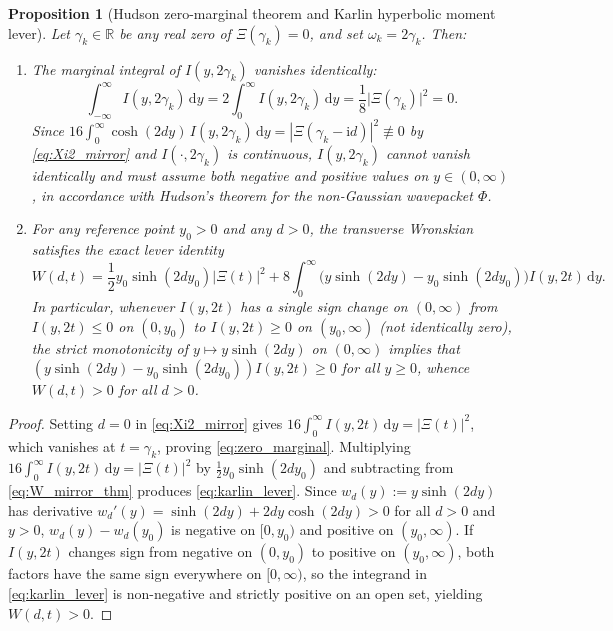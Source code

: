 \documentclass[11pt,a4paper,reqno]{amsart}
\newtheorem{proposition}[theorem]{Proposition}
\theoremstyle{definition}
\theoremstyle{remark}
\numberwithin{equation}{section}
\newcommand{\dd}{\mathrm{d}}
\newcommand{\ii}{\mathrm{i}}
\begin{document}
\begin{proposition}[Hudson zero-marginal theorem and Karlin hyperbolic moment lever]\label{prop:hudson_karlin}
Let $\gamma_k \in \mathbb{R}$ be any real zero of $\Xi(\gamma_k) = 0$, and set $\omega_k = 2\gamma_k$. Then:
\begin{enumerate}
\item[\textup{(a)}] The marginal integral of $I(y,2\gamma_k)$ vanishes identically:
\begin{equation}\label{eq:zero_marginal}
\int_{-\infty}^\infty I(y,2\gamma_k)\,\dd y = 2\int_0^\infty I(y,2\gamma_k)\,\dd y = \frac{1}{8}\big|\Xi(\gamma_k)\big|^2 = 0.
\end{equation}
Since $16\int_0^\infty \cosh(2d y)\,I(y,2\gamma_k)\,\dd y = |\Xi(\gamma_k-\ii d)|^2 \not\equiv 0$ by \eqref{eq:Xi2_mirror} and $I(\cdot,2\gamma_k)$ is continuous, $I(y,2\gamma_k)$ cannot vanish identically and must assume both negative and positive values on $y \in (0,\infty)$, in accordance with Hudson's theorem \cite{Hudson1974} for the non-Gaussian wavepacket $\Phi$.
\item[\textup{(b)}] For any reference point $y_0 > 0$ and any $d > 0$, the transverse Wronskian satisfies the exact lever identity
\begin{equation}\label{eq:karlin_lever}
W(d,t) = \frac{1}{2}y_0\sinh(2d y_0)\big|\Xi(t)\big|^2 + 8\int_0^\infty \Big(y\sinh(2d y) - y_0\sinh(2d y_0)\Big)I(y,2t)\,\dd y.
\end{equation}
In particular, whenever $I(y,2t)$ has a single sign change on $(0,\infty)$ from $I(y,2t) \le 0$ on $(0,y_0)$ to $I(y,2t) \ge 0$ on $(y_0,\infty)$ (not identically zero), the strict monotonicity of $y \mapsto y\sinh(2d y)$ on $(0,\infty)$ implies that $(y\sinh(2d y) - y_0\sinh(2d y_0))I(y,2t) \ge 0$ for all $y \ge 0$, whence $W(d,t) > 0$ for all $d > 0$.
\end{enumerate}
\end{proposition}

\begin{proof}
Setting $d = 0$ in \eqref{eq:Xi2_mirror} gives $16\int_0^\infty I(y,2t)\,\dd y = |\Xi(t)|^2$, which vanishes at $t = \gamma_k$, proving \eqref{eq:zero_marginal}. Multiplying $16\int_0^\infty I(y,2t)\,\dd y = |\Xi(t)|^2$ by $\frac{1}{2}y_0\sinh(2d y_0)$ and subtracting from \eqref{eq:W_mirror_thm} produces \eqref{eq:karlin_lever}. Since $w_d(y) := y\sinh(2d y)$ has derivative $w_d'(y) = \sinh(2d y) + 2d y\cosh(2d y) > 0$ for all $d > 0$ and $y > 0$, $w_d(y) - w_d(y_0)$ is negative on $[0,y_0)$ and positive on $(y_0,\infty)$. If $I(y,2t)$ changes sign from negative on $(0,y_0)$ to positive on $(y_0,\infty)$, both factors have the same sign everywhere on $[0,\infty)$, so the integrand in \eqref{eq:karlin_lever} is non-negative and strictly positive on an open set, yielding $W(d,t) > 0$.
\end{proof}
\end{document}
